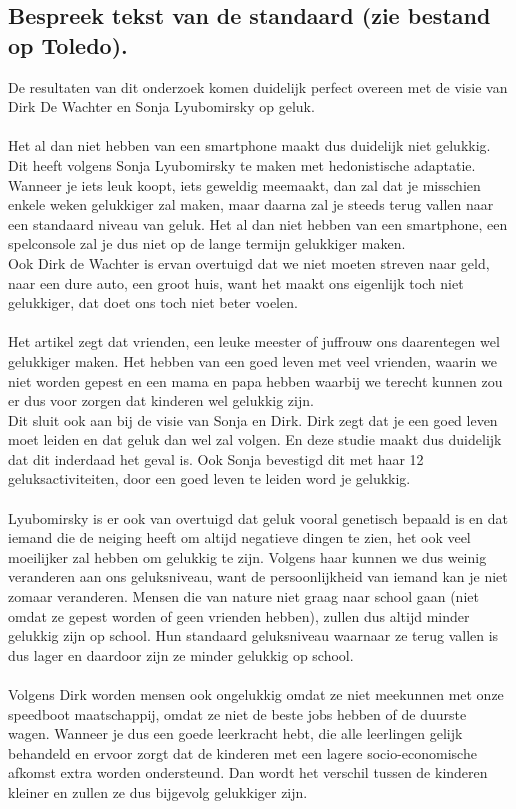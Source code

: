 \documentclass[11pt,a4paper,titlepage]{article}
\begin{document}
\subsection{Bespreek tekst van de standaard (zie bestand op Toledo).}
De resultaten van dit onderzoek komen duidelijk perfect overeen met de visie van Dirk De Wachter en Sonja Lyubomirsky op geluk. \\  \\
Het al dan niet hebben van een smartphone maakt dus duidelijk niet gelukkig. Dit heeft volgens Sonja Lyubomirsky te maken met hedonistische adaptatie. Wanneer je iets leuk koopt, iets geweldig meemaakt, dan zal dat je misschien enkele weken gelukkiger zal maken, maar daarna zal je steeds terug vallen naar een standaard niveau van geluk. Het al dan niet hebben van een smartphone, een spelconsole zal je dus niet op de lange termijn gelukkiger maken. \\
Ook Dirk de Wachter is ervan overtuigd dat we niet moeten streven naar geld, naar een dure auto, een groot huis, want het maakt ons eigenlijk toch niet gelukkiger, dat doet ons toch niet beter voelen. \\ \\
Het artikel zegt dat vrienden, een leuke meester of juffrouw ons daarentegen wel gelukkiger maken. Het hebben van een goed leven met veel vrienden, waarin we niet worden gepest en een mama en papa hebben waarbij we terecht kunnen zou er dus voor zorgen dat kinderen wel gelukkig zijn.\\
Dit sluit ook aan bij de visie van Sonja en Dirk. Dirk zegt dat je een goed leven moet leiden en dat geluk dan wel zal volgen. En deze studie maakt dus duidelijk dat dit inderdaad het geval is. Ook Sonja bevestigd dit met haar 12 geluksactiviteiten, door een goed leven te leiden word je gelukkig. \\ \\
Lyubomirsky is er ook van overtuigd dat geluk vooral genetisch bepaald is en dat iemand die de neiging heeft om altijd negatieve dingen te zien, het ook veel moeilijker zal hebben om gelukkig te zijn. Volgens haar kunnen we dus weinig veranderen aan ons geluksniveau, want de persoonlijkheid van iemand kan je niet zomaar veranderen. Mensen die van nature niet graag naar school gaan (niet omdat ze gepest worden of geen vrienden hebben), zullen dus altijd minder gelukkig zijn op school. Hun standaard geluksniveau waarnaar ze terug vallen is dus lager en daardoor zijn ze minder gelukkig op school. \\ \\
Volgens Dirk worden mensen ook ongelukkig omdat ze niet meekunnen met onze speedboot maatschappij, omdat ze niet de beste jobs hebben of de duurste wagen. Wanneer je dus een goede leerkracht hebt, die alle leerlingen gelijk behandeld en ervoor zorgt dat de kinderen met een lagere socio-economische afkomst extra worden ondersteund. Dan wordt het verschil tussen de kinderen kleiner en zullen ze dus bijgevolg gelukkiger zijn.
\end{document}
